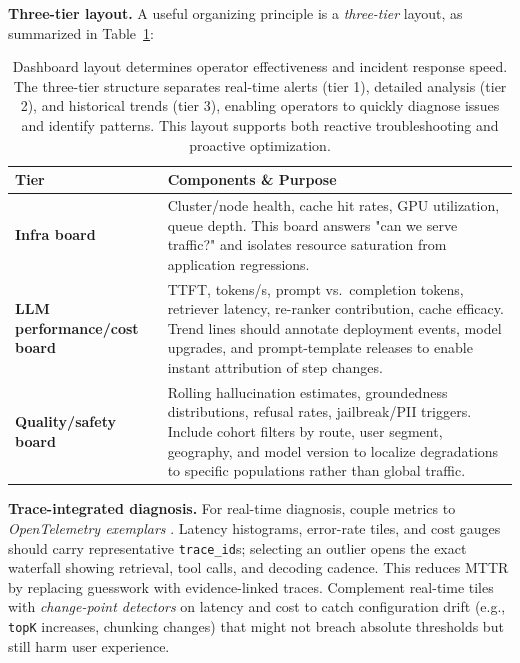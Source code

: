 \medskip
\noindent\textbf{Three-tier layout.}
A useful organizing principle is a \emph{three-tier} layout, as summarized in Table~\ref{tab:ch05_three_tier_layout}:

\begin{table}[t]
\centering
\small
\caption{Dashboard layout determines operator effectiveness and incident response speed. The three-tier structure separates real-time alerts (tier 1), detailed analysis (tier 2), and historical trends (tier 3), enabling operators to quickly diagnose issues and identify patterns. This layout supports both reactive troubleshooting and proactive optimization.}
\label{tab:ch05_three_tier_layout}
\setlength{\tabcolsep}{6pt}
\renewcommand{\arraystretch}{1.3}
\begin{tabularx}{0.95\linewidth}{@{}>{\raggedright\arraybackslash}p{4cm}X@{}}
\toprule
\rowcolor{gray!15}
\textbf{Tier} & \textbf{Components \& Purpose} \\
\midrule
\textbf{Infra board} & 
Cluster/node health, cache hit rates, GPU utilization, queue depth. This board answers "can we serve traffic?" and isolates resource saturation from application regressions. \\
\addlinespace[4pt]
\textbf{LLM performance/cost board} & 
TTFT, tokens/s, prompt vs.\ completion tokens, retriever latency, re-ranker contribution, cache efficacy. Trend lines should annotate deployment events, model upgrades, and prompt-template releases to enable instant attribution of step changes. \\
\addlinespace[4pt]
\textbf{Quality/safety board} & 
Rolling hallucination estimates, groundedness distributions, refusal rates, jailbreak/PII triggers. Include cohort filters by route, user segment, geography, and model version to localize degradations to specific populations rather than global traffic. \\
\bottomrule
\end{tabularx}
\end{table}

\medskip
\noindent\textbf{Trace-integrated diagnosis.}
For real-time diagnosis, couple metrics to \emph{OpenTelemetry exemplars} \cite{otel_spec}. Latency histograms, error-rate tiles, and cost gauges should carry representative \texttt{trace\_id}s; selecting an outlier opens the exact waterfall showing retrieval, tool calls, and decoding cadence. This reduces MTTR by replacing guesswork with evidence-linked traces. Complement real-time tiles with \emph{change-point detectors} on latency and cost to catch configuration drift (e.g., \texttt{topK} increases, chunking changes) that might not breach absolute thresholds but still harm user experience.

